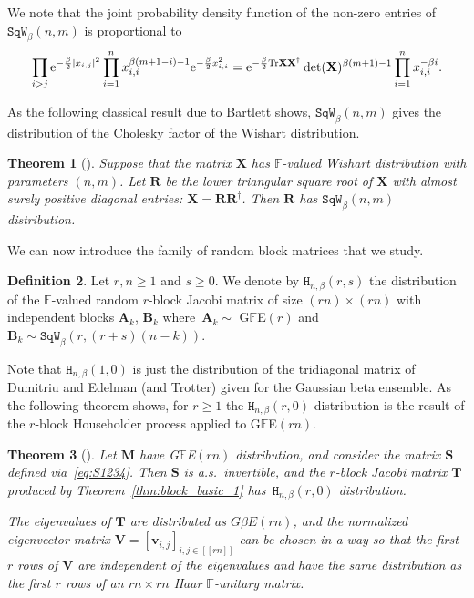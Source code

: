 \documentclass[pdftex]{sigma}
\numberwithin{equation}{section}
\newtheorem{Theorem}{Theorem}[section]
\theoremstyle{definition}
\newtheorem{Definition}[Theorem]{Definition}
\newcommand{\FF}{{\mathbb{F}}}
\newcommand{\Tr}{\textup{Tr}}
\newcommand{\T}{\dag}
\newcommand{\lst}[1]{[\![#1 ]\!]}
\newcommand{\mbf}[1]{\mathbf{#1}}
\newcommand{\HH}{\mathtt{H}_{n,\beta}}
\newcommand{\SQW}{\mathtt{SqW}_\beta}
\begin{document}
We note that the joint probability density function of the non-zero entries of $\SQW(n,m)$ is proportional to
\begin{align*}
 \prod_{i>j} {\rm e}^{-\frac{\beta}{2} |x_{i,j}|^2} \prod_{i=1}^n x_{i,i}^{\beta (m+1-i)-1} {\rm e}^{-\frac{\beta}{2} x_{i,i}^2}={\rm e}^{-\frac{\beta}{2} \Tr \mbf{X}\mbf{X}^\T} \det(\mbf{X})^{\beta (m+1)-1} \prod_{i=1}^n x_{i,i}^{-\beta i}.
\end{align*}





As the following classical result due to Bartlett \cite{Bartlett1933} shows, $\SQW(n,m)$ gives the distribution of the Cholesky factor of the Wishart distribution.
\begin{Theorem}[\cite{Bartlett1933}]\label{thm:bartlett}
 Suppose that the matrix $\mbf{X}$ has $\FF$-valued Wishart distribution with parameters $(n,m)$. Let $\mbf{R}$ be the lower triangular square root of $\mbf{X}$ with almost surely positive diagonal entries: $\mbf{X}=\mbf{R} \mbf{R}^{\T}$. Then $\mbf{R}$ has $\SQW(n,m)$ distribution.
\end{Theorem}

We can now introduce the family of random block matrices that we study.

\begin{Definition}
\label{def:BlockH}
Let $r,n\ge 1$ and $s\ge 0$.
We denote by $\HH(r,s)$ the distribution of the $\FF$-valued random $r$-block Jacobi matrix of size
$(rn)\times(rn)$ with independent blocks $\mbf{A}_k$,
 $\mbf{B}_k$ where~${\mbf{A}_k\sim}$ G$\FF$E$(r)$ and $\mbf{B}_k\sim \SQW(r,(r+s)(n-k))$.
\end{Definition}


Note that $\HH(1,0)$ is just the distribution of the tridiagonal matrix of Dumitriu and Edelman (and Trotter) given for the Gaussian beta ensemble. As the following theorem shows, for $r\ge 1$ the $\HH(r,0)$ distribution is the result of the $r$-block Householder process applied to G$\FF$E$(rn)$.


\begin{Theorem}[\cite{Spike2}]\label{thm:GFE_block}
Let $\mbf{M}$ have G$\FF$E$(rn)$ distribution, and consider the matrix $\mbf{S}$ defined via~\eqref{eq:S1234}. Then $\mbf{S}$ is a.s.~invertible, and the $r$-block Jacobi matrix $\mbf{T}$ produced by Theorem~{\rm\ref{thm:block_basic_1}} has~$\HH(r,0)$ distribution.

The eigenvalues of $\mbf{T}$ are distributed as $G\beta E(rn)$, and the normalized eigenvector matrix $\mbf{V}=[\mbf{v}_{i,j}]_{i,j\in \lst{rn}}$ can be chosen in a way so that the first $r$ rows of $\mbf{V}$ are independent of the eigenvalues and have the same distribution as the first $r$ rows of an $rn\times rn$ Haar $\FF$-unitary matrix.
\end{Theorem}
\end{document}
